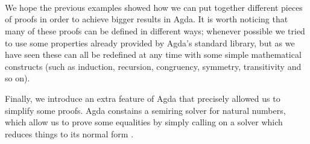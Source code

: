 {\begin{code}
\>[28][@{}l@{\AgdaIndent{0}}]%
\>[30]\AgdaSymbol{(}\AgdaSpace{}%
\AgdaSymbol{((}\AgdaSpace{}%
\AgdaOperator{\AgdaInductiveConstructor{,}}\AgdaSpace{}%
\AgdaSpace{}%
\AgdaSpace{}%
\AgdaSymbol{)}\AgdaSpace{}%
\AgdaSpace{}%
\AgdaSymbol{))}\<%
\\
%
\>[30]\AgdaSymbol{(}\AgdaSpace{}%
\AgdaSymbol{((}\AgdaSpace{}%
\AgdaOperator{\AgdaInductiveConstructor{,}}\AgdaSpace{}%
\AgdaSpace{}%
\AgdaSpace{}%
\AgdaSymbol{)}\AgdaSpace{}%
\AgdaSpace{}%
\AgdaSymbol{))}\<%
\\
%
\>[28]\AgdaSymbol{)}\<%
\\
\>[0]\<%
\end{code}

We hope the previous examples showed how we can put together different pieces of proofs in order to achieve bigger results in Agda. It is worth noticing that many of these proofs can be defined in different ways; whenever possible we tried to use some properties already provided by Agda's standard library, but as we have seen these can all be redefined at any time with some simple mathematical constructs (such as induction, recursion, congruency, symmetry, transitivity and so on).

Finally, we introduce an extra feature of Agda that precisely allowed us to simplify some proofs. Agda constains a semiring solver for natural numbers, which allow us to prove some equalities by simply calling on a solver which reduces things to its normal form \cite{2018UsingSolver}.

}
